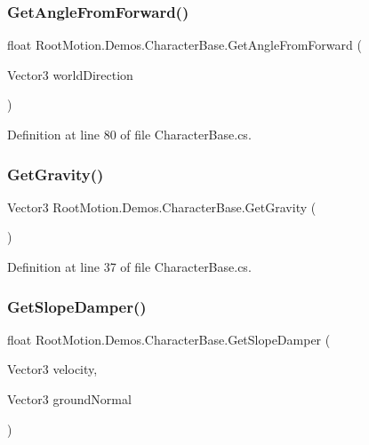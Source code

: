 \subsubsection{\texorpdfstring{Get\+Angle\+From\+Forward()}{GetAngleFromForward()}}
{\footnotesize\ttfamily float Root\+Motion.\+Demos.\+Character\+Base.\+Get\+Angle\+From\+Forward (\begin{DoxyParamCaption}\item[{Vector3}]{world\+Direction }\end{DoxyParamCaption})}



Definition at line 80 of file Character\+Base.\+cs.

\mbox{\label{class_root_motion_1_1_demos_1_1_character_base_ab7d3a5a30808874fd072a1fb448342b6}} 
\subsubsection{\texorpdfstring{Get\+Gravity()}{GetGravity()}}
{\footnotesize\ttfamily Vector3 Root\+Motion.\+Demos.\+Character\+Base.\+Get\+Gravity (\begin{DoxyParamCaption}{ }\end{DoxyParamCaption})\hspace{0.3cm}{\ttfamily [protected]}}



Definition at line 37 of file Character\+Base.\+cs.

\mbox{\label{class_root_motion_1_1_demos_1_1_character_base_a3d3040ec47e5a4cc2c35c4aa7ae5e227}} 
\subsubsection{\texorpdfstring{Get\+Slope\+Damper()}{GetSlopeDamper()}}
{\footnotesize\ttfamily float Root\+Motion.\+Demos.\+Character\+Base.\+Get\+Slope\+Damper (\begin{DoxyParamCaption}\item[{Vector3}]{velocity,  }\item[{Vector3}]{ground\+Normal }\end{DoxyParamCaption})\hspace{0.3cm}{\ttfamily [protected]}}



